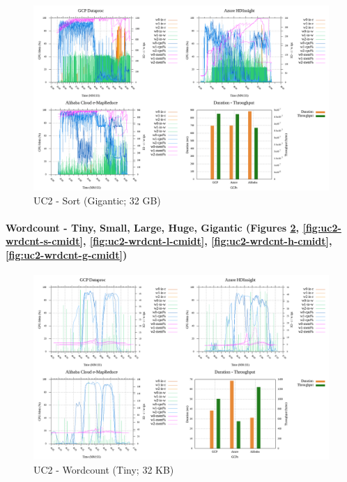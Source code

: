 \documentclass[review]{elsarticle}
\begin{document}
\begin{figure}[p]
	\caption{UC2 - Sort (Gigantic; 32 GB)}
	\label{fig:uc2-srt-g-cmidt}
	\includegraphics[width=\textwidth]{uc2-srt-g-cmidt}
	\centering
\end{figure}


\paragraph{Wordcount - Tiny, Small, Large, Huge, Gigantic (Figures \ref{fig:uc2-wrdcnt-t-cmidt}, \ref{fig:uc2-wrdcnt-s-cmidt}, \ref{fig:uc2-wrdcnt-l-cmidt}, \ref{fig:uc2-wrdcnt-h-cmidt}, \ref{fig:uc2-wrdcnt-g-cmidt})}

\begin{figure}[p]
	\caption{UC2 - Wordcount (Tiny; 32 KB)}
	\label{fig:uc2-wrdcnt-t-cmidt}
	\includegraphics[width=\textwidth]{uc2-wrdcnt-t-cmidt}
	\centering
\end{figure}
\end{document}
